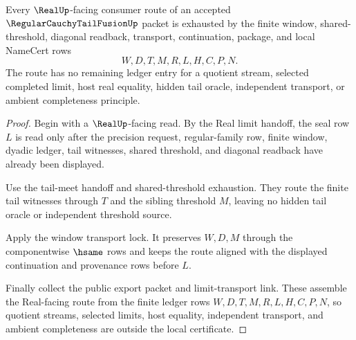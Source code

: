 \begin{theorem}
\label{thm:regular-cauchy-tail-fusion-ledger-exactness}
Every $\RealUp$-facing consumer route of an accepted $\RegularCauchyTailFusionUp$ packet is exhausted by the finite window, shared-threshold, diagonal readback, transport, continuation, package, and local NameCert rows
$$
W,D,T,M,R,L,H,C,P,N.
$$
The route has no remaining ledger entry for a quotient stream, selected completed limit, host real equality, hidden tail oracle, independent transport, or ambient completeness principle.
\end{theorem}
\begin{proof}
Begin with a $\RealUp$-facing read. By the Real limit handoff, the seal row $L$ is read only after the precision request, regular-family row, finite window, dyadic ledger, tail witnesses, shared threshold, and diagonal readback have already been displayed.

Use the tail-meet handoff and shared-threshold exhaustion. They route the finite tail witnesses through $T$ and the sibling threshold $M$, leaving no hidden tail oracle or independent threshold source.

Apply the window transport lock. It preserves $W,D,M$ through the componentwise $\hsame$ rows and keeps the route aligned with the displayed continuation and provenance rows before $L$.

Finally collect the public export packet and limit-transport link. These assemble the Real-facing route from the finite ledger rows $W,D,T,M,R,L,H,C,P,N$, so quotient streams, selected limits, host equality, independent transport, and ambient completeness are outside the local certificate.
\end{proof}

